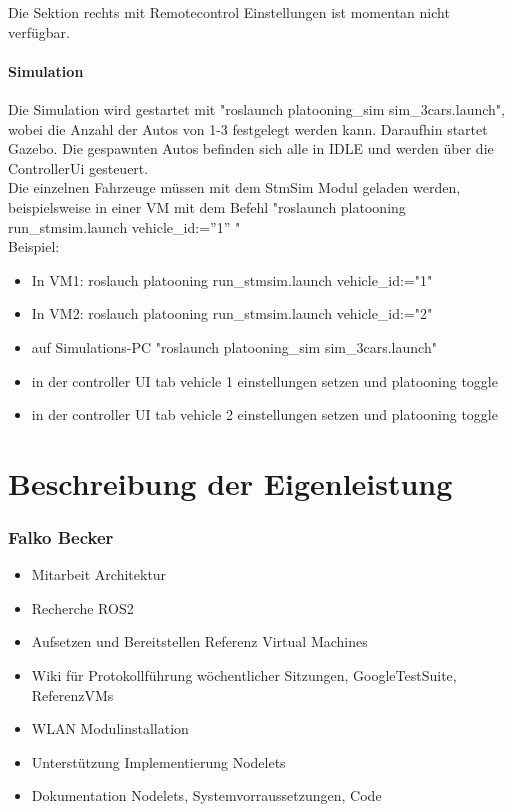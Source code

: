 \documentclass[a4paper, 12pt, titlepage]{scrartcl}
\begin{document}
{	Die Sektion rechts mit Remotecontrol Einstellungen ist momentan nicht verfügbar.

	\subsection*{Simulation}
	Die Simulation wird gestartet mit "roslaunch platooning\_sim sim\_3cars.launch", wobei die Anzahl der Autos von 1-3 festgelegt werden kann. Daraufhin startet Gazebo. Die gespawnten Autos befinden sich alle in IDLE und werden über die ControllerUi gesteuert.\\

	Die einzelnen Fahrzeuge müssen mit dem StmSim Modul geladen werden, beispielsweise in einer VM mit dem Befehl "roslaunch platooning run\_stmsim.launch vehicle\_id:=''1'' "\\

	Beispiel:\\
	\begin{itemize}
		\item In VM1: roslauch platooning run\_stmsim.launch vehicle\_id:="1"
		\item In VM2: roslauch platooning run\_stmsim.launch vehicle\_id:="2"
		\item auf Simulations-PC "roslaunch platooning\_sim sim\_3cars.launch"
		\item in der controller UI tab vehicle 1 einstellungen setzen und platooning toggle
		\item in der controller UI tab vehicle 2 einstellungen setzen und platooning toggle
	\end{itemize}

\newpage
\part{Beschreibung der Eigenleistung}
\label{eigenleistung}
	\section{Falko Becker}
	\begin{itemize}
		\item Mitarbeit Architektur
		\item Recherche ROS2
		\item Aufsetzen und Bereitstellen Referenz Virtual Machines
		\item Wiki für Protokollführung wöchentlicher Sitzungen, GoogleTestSuite, ReferenzVMs
		\item WLAN Modulinstallation
		\item Unterstützung Implementierung Nodelets
		\item Dokumentation Nodelets, Systemvorraussetzungen, Code
	\end{itemize}
}
\end{document}
